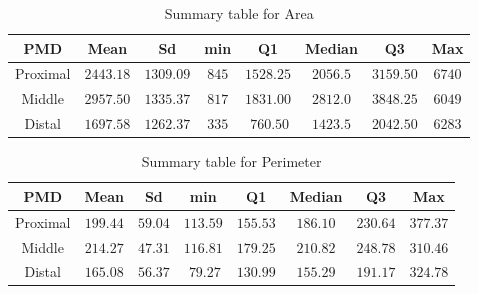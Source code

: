 \documentclass{article}\usepackage[]{graphicx}\usepackage[]{color}
\numberwithin{figure}{subsection} %
\numberwithin{table}{subsection} %
\begin{document}
\newpage
\begin{table}[!htbp]
{\footnotesize
\begin{center}
\begin{tabular}{cccccccc}
\hline\hline
\multicolumn{1}{c}{PMD}&\multicolumn{1}{c}{Mean}&\multicolumn{1}{c}{Sd}&\multicolumn{1}{c}{min}&\multicolumn{1}{c}{Q1}&\multicolumn{1}{c}{Median}&\multicolumn{1}{c}{Q3}&\multicolumn{1}{c}{Max}\tabularnewline
\hline
Proximal&$2443.18$&$1309.09$&$845$&$1528.25$&$2056.5$&$3159.50$&$6740$\tabularnewline
Middle&$2957.50$&$1335.37$&$817$&$1831.00$&$2812.0$&$3848.25$&$6049$\tabularnewline
Distal&$1697.58$&$1262.37$&$335$&$~760.50$&$1423.5$&$2042.50$&$6283$\tabularnewline
\hline
\end{tabular}
\caption{Summary table for Area\label{tab_area_pmd}}\end{center}}
\end{table}

 \vspace{0.5cm}
\begin{table}[!htbp]
{\footnotesize
\begin{center}
\begin{tabular}{cccccccc}
\hline\hline
\multicolumn{1}{c}{PMD}&\multicolumn{1}{c}{Mean}&\multicolumn{1}{c}{Sd}&\multicolumn{1}{c}{min}&\multicolumn{1}{c}{Q1}&\multicolumn{1}{c}{Median}&\multicolumn{1}{c}{Q3}&\multicolumn{1}{c}{Max}\tabularnewline
\hline
Proximal&$199.44$&$59.04$&$113.59$&$155.53$&$186.10$&$230.64$&$377.37$\tabularnewline
Middle&$214.27$&$47.31$&$116.81$&$179.25$&$210.82$&$248.78$&$310.46$\tabularnewline
Distal&$165.08$&$56.37$&$~79.27$&$130.99$&$155.29$&$191.17$&$324.78$\tabularnewline
\hline
\end{tabular}
\caption{Summary table for Perimeter\label{tab_per_pmd}}\end{center}}
\end{table}

 \vspace{0.5cm}
\end{document}
